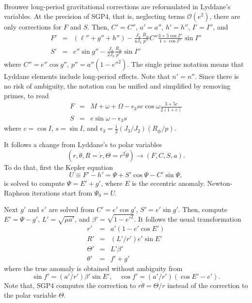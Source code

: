 \documentclass{article}
\begin{document}
Brouwer long-period gravitational corrections are reformulated in Lyddane's variables. At the precision of SGP4, that is, neglecting terms $\mathcal{O}(e^2)$, there are only corrections for $F$ and $S$. Then, $C'= C''$, $a'=a''$, $h'=h''$, $I'=I''$, and
\begin{eqnarray*}
F' &=& (\ell''+g''+h'')-\frac{J_3}{4J_2}\frac{R_\oplus}{p''}C''\frac{3+5\cos{I}''}{1+\cos{I}''}\sin{I}'' \\
S' &=&  e''\sin{g}'' -\frac{J_3}{2J_2}\frac{R_\oplus}{p''}\sin{I}''
\end{eqnarray*}
where $C''=e''\cos{g}''$, $p''=a''(1-e''^2)$. The single prime notation means that Lyddane elements include long-period effects. Note that $n'=n''$. Since there is no risk of ambiguity, the notation can be unified and simplified by removing primes, to read
\begin{eqnarray*}
F &=&  M + \omega + \Omega - \epsilon_3 s e \cos{\omega}\frac{3+5c}{2(1+c)} \\
S &=& e\sin{\omega} - \epsilon_3 s
\end{eqnarray*}
where $c=\cos{I}$, $s=\sin{I}$, and $\epsilon_3=\frac{1}{2}(J_3/J_2)(R_\oplus/p)$.

It follows a change from Lyddane's to polar variables
\[
(r,\theta,R=\dot{r},\Theta=r^2\dot\theta)\longrightarrow(F,C,S,a).
\]
To do that, first the Kepler equation
\[
U\equiv{F'-h'}=\Psi+S'\cos\Psi-C'\sin\Psi,
\]
is solved to compute $\Psi=E'+g'$, where $E$ is the eccentric anomaly. Newton-Raphson iterations start from $\Psi_0=U$.

Next $g'$ and $e'$ are solved from $C'=e'\cos{g'}$, $S'=e'\sin{g}'$. Then, compute $E'=\Psi-g'$, $L'=\sqrt{\mu{a}'}$, and $\beta'=\sqrt{1-e'^2}$. It follows the usual transformation
\begin{eqnarray} \label{utor}
r' &=& a'(1-e'\cos{E}') \\
R' &=& (L'/r')e'\sin{E}' \\
\Theta' &=& L'\beta' \\
\theta' &=& f'+g'
\end{eqnarray}
where the true anomaly is obtained without ambiguity from
\begin{equation} \label{utof}
\sin{f}'=(a'/r')\beta'\sin{E}',\quad \cos{f}'=(a'/r')(\cos{E}'-e').
\end{equation}
Note that, SGP4 computes the correction to $r\dot\theta=\Theta/r$ instead of the correction to the polar variable $\Theta$.
\end{document}
